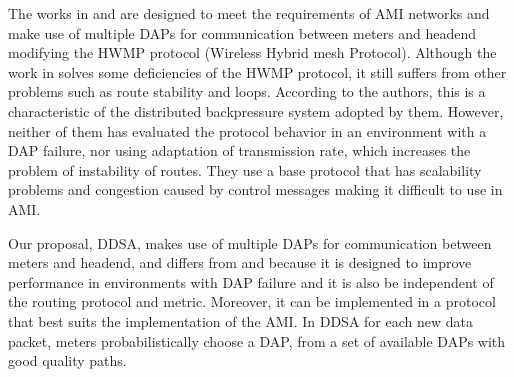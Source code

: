 \documentclass[conference]{IEEEtran}
\begin{document}
The works in \cite{6412861} and \cite{Gharavi2011} are designed to meet the requirements of AMI networks and make use of multiple DAPs for communication between meters and headend modifying the HWMP protocol (Wireless Hybrid mesh Protocol). Although the work in \cite{Gharavi2011} solves some deficiencies of the HWMP protocol, it still suffers from other problems such as route stability and loops. According to the authors, this is a characteristic of the distributed backpressure system adopted by them. However, neither of them has evaluated the protocol behavior in an environment with a DAP failure, nor using adaptation of transmission rate, which increases the problem of instability of routes. They use a base protocol that has scalability problems and congestion caused by control messages \cite{5473885} making it difficult to use in AMI.


Our proposal, DDSA, makes use of multiple DAPs for communication between meters and headend, and differs from \cite{6412861} and \cite{Gharavi2011} because it is designed to improve performance in environments with DAP failure and it is also be independent of the routing protocol and metric. Moreover, it can be implemented in a protocol that best suits the implementation of the AMI.
In DDSA for each new data packet, meters probabilistically choose a DAP, from a set of available DAPs with good quality paths. 



 

\end{document}
